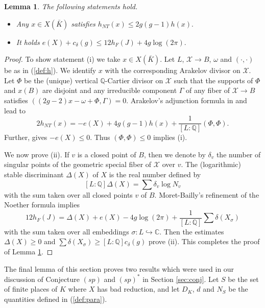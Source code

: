 \documentclass[11pt]{article}
\newtheorem{lemma}[theorem]{Lemma}
\numberwithin{equation}{section}
\newcommand {\QQ}  {{\mathbb Q}}
\newcommand {\cc} {sp}
\newcommand {\bb} {(sp)^*}
\newcommand {\p} {x}
\begin{document}
\begin{lemma}\label{lem:nth}
The following statements hold.
\begin{itemize}
\item[(i)] Any $\p\in X(\bar{K})$ satisfies $h_{NT}(\p)\leq 2g(g-1)h(\p).$
\item[(ii)] It holds $e(X)+c_\delta(g)\leq 12h_F(J)+4g\log(2\pi).$
\end{itemize}
\end{lemma}
\begin{proof}
To show statement (i) we take $\p\in X(\bar{K})$. Let $L$, $\mathcal X\to B$, $\omega$ and $(\cdot,\cdot)$ be as in (\ref{def:h}). We identify $\p$ with the corresponding Arakelov divisor on $\mathcal X$. Let $\Phi$ be the (unique) vertical $\QQ$-Cartier divisor on $\mathcal X$ such that the supports of $\Phi$ and $\p(B)$ are disjoint and any irreducible component $\Gamma$ of any fiber of $\mathcal X\to B$ satisfies $((2g-2)x-\omega+\Phi,\Gamma)=0$. 
Arakelov's adjunction formula in \cite{arakelov:intersectiontheory} and  \cite[Theorem 4.c)]{faltings:arithmeticsurfaces} lead to
$$2h_{NT}(\p)=-e(X)+4g(g-1)h(x)+\frac{1}{[L:\QQ]}(\Phi,\Phi).$$
Further, \cite[Theorem 5.a)]{faltings:arithmeticsurfaces} gives $-e(X)\leq 0$. Thus $(\Phi,\Phi)\leq 0$ implies (i).

We now prove (ii). If $v$ is a closed point  of $B$, then we denote by $\delta_v$ the number of singular points of the geometric special fiber of $\mathcal X$ over $v$. The (logarithmic) stable discriminant $\Delta(X)$ of $X$ is the real number defined by 
\begin{equation}\label{def:discriminant}
[L:\QQ]\Delta(X) =\sum\delta_v\log N_v
\end{equation}
with the sum taken over all closed points $v$ of $B$. Moret-Bailly's refinement \cite[Th\'eor\`eme 2.5]{moba:noether} of the Noether formula \cite[Theorem 6]{faltings:arithmeticsurfaces} implies
$$
12h_F(J)=\Delta(X)+e(X)-4g\log(2\pi)+\frac{1}{[L:\QQ]}\sum \delta(X_\sigma)
$$
with the sum taken over all embeddings $\sigma:L\hookrightarrow \mathbb C$. 
Then the estimates $\Delta(X)\geq 0$ and $\sum \delta(X_\sigma)
\geq [L:\QQ]c_\delta(g)$ prove (ii). This completes the proof of Lemma \ref{lem:nth}. 
\end{proof}

The final lemma of this section proves two results which were used in our discussion of Conjecture $(\cc)$ and $\bb$ in Section \ref{sec:conj}. Let $S$ be the set of finite places of $K$ where $X$ has bad reduction, and let $D_K$, $d$ and $N_S$ be the quantities defined in (\ref{def:para}).
\end{document}
